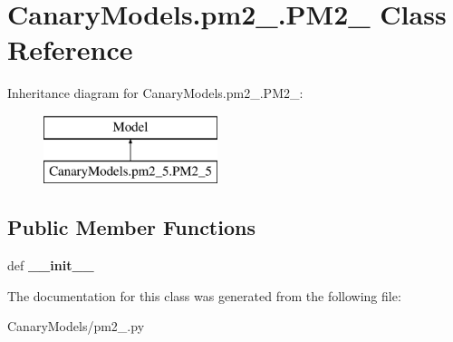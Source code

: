 \hypertarget{class_canary_models_1_1pm2__5_1_1_p_m2__5}{\section{Canary\-Models.\-pm2\-\_.\-P\-M2\-\_ Class Reference}
\label{class_canary_models_1_1pm2__5_1_1_p_m2__5}
}
Inheritance diagram for Canary\-Models.\-pm2\-\_.\-P\-M2\-\_\-:\begin{figure}[H]
\begin{center}
\leavevmode
\includegraphics[height=2.000000cm]{class_canary_models_1_1pm2__5_1_1_p_m2__5}
\end{center}
\end{figure}
\subsection*{Public Member Functions}
\begin{DoxyCompactItemize}
\item 
\hypertarget{class_canary_models_1_1pm2__5_1_1_p_m2__5_af6ef2a3cc56b6274a83949ce1bc3f5a9}{def {\bfseries \-\_\-\-\_\-init\-\_\-\-\_\-}}\label{class_canary_models_1_1pm2__5_1_1_p_m2__5_af6ef2a3cc56b6274a83949ce1bc3f5a9}

\end{DoxyCompactItemize}


The documentation for this class was generated from the following file\-:\begin{DoxyCompactItemize}
\item 
Canary\-Models/pm2\-\_.\-py\end{DoxyCompactItemize}
